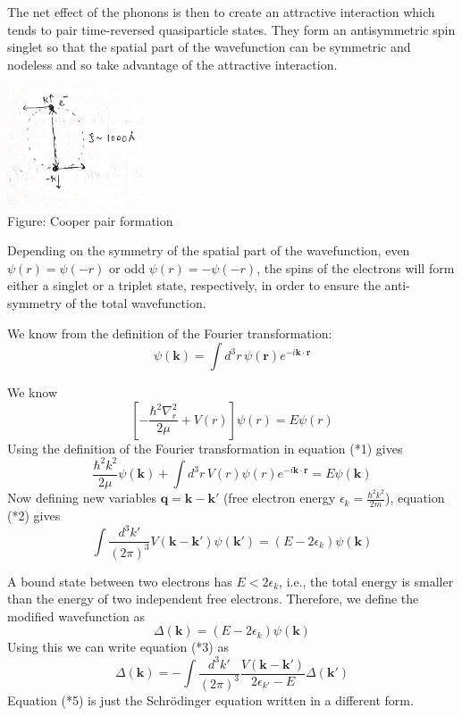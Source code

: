 \documentclass{article}
\begin{document}
The net effect of the phonons is then to create an attractive interaction which tends to pair time-reversed quasiparticle states. They form an antisymmetric spin singlet so that the spatial part of the wavefunction can be symmetric and nodeless and so take advantage of the attractive interaction.

\begin{center}
    \includegraphics[width=0.3\textwidth]{figures/pairing.png} \\
    Figure: Cooper pair formation
\end{center}

Depending on the symmetry of the spatial part of the wavefunction, even $\psi(r) = \psi(-r)$ or odd $\psi(r) = -\psi(-r)$, the spins of the electrons will form either a singlet or a triplet state, respectively, in order to ensure the anti-symmetry of the total wavefunction.

We know from the definition of the Fourier transformation:
\[
\psi(\mathbf{k}) = \int d^3r \, \psi(\mathbf{r}) e^{-i\mathbf{k} \cdot \mathbf{r}} \tag{1}
\]

We know
\[
\left[ -\frac{\hbar^2 \nabla_r^2}{2\mu} + V(r) \right] \psi(r) = E \psi(r) \tag{*1}
\]
Using the definition of the Fourier transformation in equation (*1) gives
\[
\frac{\hbar^2 k^2}{2\mu} \psi(\mathbf{k}) + \int d^3r \, V(r) \psi(r) e^{-i\mathbf{k} \cdot \mathbf{r}} = E \psi(\mathbf{k}) \tag{*2}
\]
Now defining new variables $\mathbf{q} = \mathbf{k} - \mathbf{k}'$ (free electron energy $\epsilon_k = \frac{\hbar^2 k^2}{2m}$), equation (*2) gives
\[
\int \frac{d^3 k'}{(2\pi)^3} V(\mathbf{k} - \mathbf{k'}) \psi(\mathbf{k'}) = (E - 2\epsilon_k) \psi(\mathbf{k}) \tag{*3}
\]

A bound state between two electrons has $E < 2\epsilon_k$, i.e., the total energy is smaller than the energy of two independent free electrons. Therefore, we define the modified wavefunction as
\[
\Delta(\mathbf{k}) = (E - 2\epsilon_k) \psi(\mathbf{k}) \tag{*4}
\]
Using this we can write equation (*3) as
\[
\Delta(\mathbf{k}) = - \int \frac{d^3 k'}{(2\pi)^3} \frac{V(\mathbf{k} - \mathbf{k'})}{2\epsilon_{k'} - E} \Delta(\mathbf{k'}) \tag{*5}
\]
Equation (*5) is just the Schrödinger equation written in a different form.
\end{document}
